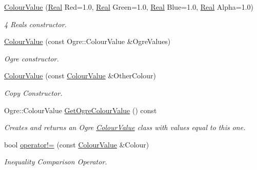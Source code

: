 \begin{DoxyCompactItemize}
\item 
\hyperlink{classMezzanine_1_1ColourValue_a75f43b4c3e540ccfe32b5770aa0d2676}{ColourValue} (\hyperlink{namespaceMezzanine_a726731b1a7df72bf3583e4a97282c6f6}{Real} Red=1.0, \hyperlink{namespaceMezzanine_a726731b1a7df72bf3583e4a97282c6f6}{Real} Green=1.0, \hyperlink{namespaceMezzanine_a726731b1a7df72bf3583e4a97282c6f6}{Real} Blue=1.0, \hyperlink{namespaceMezzanine_a726731b1a7df72bf3583e4a97282c6f6}{Real} Alpha=1.0)
\begin{DoxyCompactList}\small\item\em 4 Reals constructor. \item\end{DoxyCompactList}\item 
\hyperlink{classMezzanine_1_1ColourValue_a68d3605eed96bf7f8f969dcd06c736e4}{ColourValue} (const Ogre::ColourValue \&OgreValues)
\begin{DoxyCompactList}\small\item\em Ogre constructor. \item\end{DoxyCompactList}\item 
\hyperlink{classMezzanine_1_1ColourValue_a75ed65fd1d1314ad15b40165eefbc3e6}{ColourValue} (const \hyperlink{classMezzanine_1_1ColourValue}{ColourValue} \&OtherColour)
\begin{DoxyCompactList}\small\item\em Copy Constructor. \item\end{DoxyCompactList}\item 
Ogre::ColourValue \hyperlink{classMezzanine_1_1ColourValue_a7e0b3548fc11cdcbd89fab3ad53faaf1}{GetOgreColourValue} () const 
\begin{DoxyCompactList}\small\item\em Creates and returns an Ogre \hyperlink{classMezzanine_1_1ColourValue}{ColourValue} class with values equal to this one. \item\end{DoxyCompactList}\item 
bool \hyperlink{classMezzanine_1_1ColourValue_abeebcf4e38cd1a81f45a7cee35e580f2}{operator!=} (const \hyperlink{classMezzanine_1_1ColourValue}{ColourValue} \&Colour)
\begin{DoxyCompactList}\small\item\em Inequality Comparison Operator. \item\end{DoxyCompactList}\item 

\end{DoxyCompactItemize}
